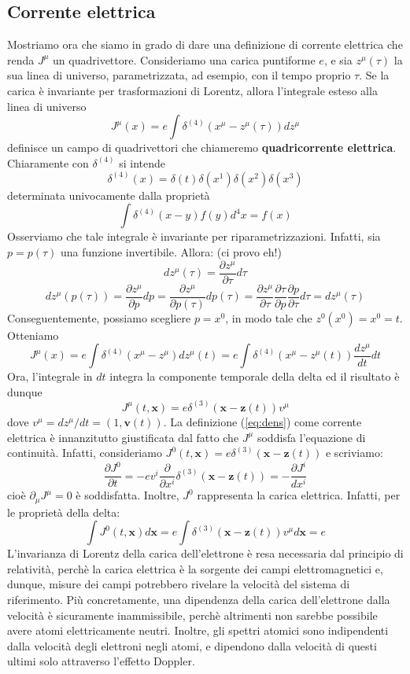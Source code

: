 \documentclass[a4paper,11pt]{book}
\theoremstyle{plain}
\theoremstyle{definition}
\begin{document}
\subsection{Corrente elettrica}
Mostriamo ora che siamo in grado di dare una definizione di corrente elettrica che renda $J^{\mu}$ un quadrivettore. Consideriamo una carica puntiforme $e$, e sia $z^{\mu}(\tau)$ la sua linea di universo, parametrizzata, ad esempio, con il tempo proprio $\tau$. Se la carica è invariante per trasformazioni di Lorentz, allora l'integrale esteso alla linea di universo
\[
J^{\mu}(x) = e\int \delta^{(4)}(x^{\mu}-z^{\mu}(\tau) )dz^{\mu}
\]
definisce un campo di quadrivettori che chiameremo \textbf{quadricorrente elettrica}. Chiaramente con $\delta^{(4)}$ si intende
\[
\delta^{(4)}(x) = \delta(t)\delta(x^1)\delta(x^2)\delta(x^3)
\]
determinata univocamente dalla proprietà
\[
\int \delta^{(4)}(x-y)f(y) d^4x = f(x)
\]
Osserviamo che tale integrale è invariante per riparametrizzazioni. Infatti, sia $p=p(\tau)$ una funzione invertibile. Allora: (ci provo eh!)
\[
dz^{\mu}(\tau) = \frac{\partial z^{\mu}}{\partial \tau}d\tau
\]
\[
dz^{\mu}(p(\tau))=\frac{\partial z^{\mu}}{\partial p}dp=\frac{\partial z^{\mu}}{\partial p(\tau)}dp(\tau) = \frac{\partial z^{\mu}}{\partial \tau}\frac{\partial \tau}{\partial p}\frac{\partial p}{\partial \tau}d\tau = dz^{\mu}(\tau)
\]
Conseguentemente, possiamo scegliere $p=x^0$, in modo tale che $z^0(x^0)=x^0=t$. Otteniamo
\[
J^{\mu}(x) = e\int \delta^{(4)}(x^{\mu}-z^{\mu})dz^{\mu}(t)=e\int \delta^{(4)}(x^{\mu}-z^{\mu}(t))\frac{dz^{\mu}}{dt}dt
\]
Ora, l'integrale in $dt$ integra la componente temporale della delta ed il risultato è dunque
\begin{equation}\label{eq:dens}
J^{\mu}(t,\textbf{x}) = e\delta^{(3)}(\textbf{x}-\textbf{z}(t))v^{\mu}
\end{equation}
dove $v^{\mu}=dz^{\mu}/dt=(1,\textbf{v}(t))$. La definizione (\ref{eq:dens}) come corrente elettrica è innanzitutto giustificata dal fatto che $J^{\mu}$ soddisfa l'equazione di continuità. Infatti, consideriamo $J^0(t,\textbf{x})=e\delta^{(3)}(\textbf{x}-\textbf{z}(t))$ e scriviamo:
\[
\frac{\partial J^0}{\partial t}=-ev^i\frac{\partial}{\partial x^i}\delta^{(3)}(\textbf{x}-\textbf{z}(t))=-\frac{\partial J^i}{dx^i}
\]
cioè $\partial_{\mu}J^{\mu}=0$ è soddisfatta. Inoltre, $J^0$ rappresenta la carica elettrica. Infatti, per le proprietà della delta:
\[
\int J^0(t,\textbf{x})d\textbf{x}=e\int \delta^{(3)}(\textbf{x}-\textbf{z}(t))v^{\mu}d\textbf{x}=e
\]
L'invarianza di Lorentz della carica dell'elettrone è resa necessaria dal principio di relatività, perchè la carica elettrica è la sorgente dei campi elettromagnetici e, dunque, misure dei campi potrebbero rivelare la velocità del sistema di riferimento. Più concretamente, una dipendenza della carica dell'elettrone dalla velocità è sicuramente inammissibile, perchè altrimenti non sarebbe possibile avere atomi elettricamente neutri. Inoltre, gli spettri atomici sono indipendenti dalla velocità degli elettroni negli atomi, e dipendono dalla velocità di questi ultimi solo attraverso l'effetto Doppler. \\
\end{document}
